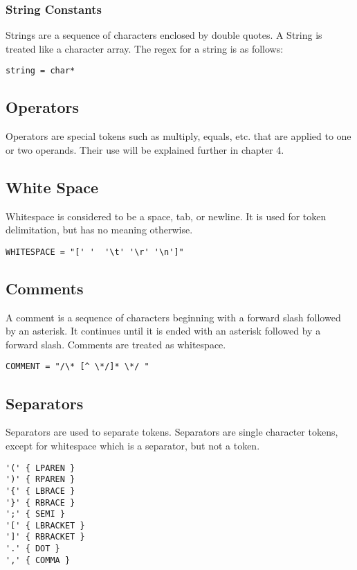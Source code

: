 \documentclass{article}
\begin{document}
\subsubsection{String Constants}
Strings are a sequence of characters enclosed by double quotes. A String is treated like a character array. The regex for a string is as follows:

\begin{Verbatim}[frame=single]
string = char*
\end{Verbatim}

\subsection{Operators}
Operators are special tokens such as multiply, equals, etc. that are applied to one or two operands.  Their use will be explained further in chapter 4.

\subsection{White Space}
Whitespace is considered to be a space, tab, or newline. It is used for token delimitation, but has no meaning otherwise. 

\begin{Verbatim}[frame=single]
WHITESPACE = "[' '  '\t' '\r' '\n']"
\end{Verbatim}

\subsection{Comments}
A comment is a sequence of characters beginning with a forward slash followed by an asterisk. It continues until it is ended with an asterisk followed by a forward slash. Comments are treated as whitespace. 
\begin{Verbatim}[frame=single]
COMMENT = "/\* [^ \*/]* \*/ "
\end{Verbatim}

\subsection{Separators}
Separators are used to separate tokens. Separators are single character tokens, except for whitespace which is a separator, but not a token. 
\begin{Verbatim}[frame=single]
'('	{ LPAREN }
')'	{ RPAREN }
'{'	{ LBRACE }
'}'	{ RBRACE }
';'	{ SEMI }
'['	{ LBRACKET }
']'	{ RBRACKET }
'.'	{ DOT }
','	{ COMMA }
\end{Verbatim}
\end{document}
